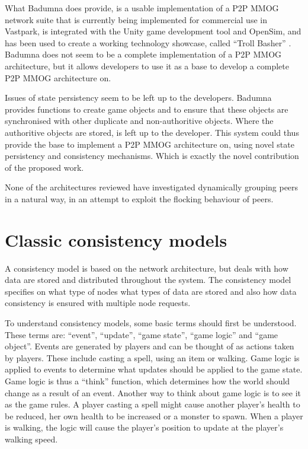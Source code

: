 \documentclass[journal,oneside,a4paper,onecolumn]{IEEEtran}
\begin{document}
What Badumna does provide, is a usable implementation of a P2P MMOG network suite that is currently being implemented for commercial use in Vastpark, is integrated with the Unity game development tool and OpenSim, and has been used to create a working technology showcase, called ``Troll Basher'' \cite{badumna_showcase}. Badumna does not seem to be a complete implementation of a P2P MMOG architecture, but it allows developers to use it as a base to develop a complete P2P MMOG architecture on.

Issues of state persistency seem to be left up to the developers. Badumna provides functions to create game objects and to ensure that these objects are synchronised with other duplicate and non-authoritive objects. Where the authoritive objects are stored, is left up to the developer. This system could thus provide the base to implement a P2P MMOG architecture on, using novel state persistency and consistency mechanisms. Which is exactly the novel contribution of the proposed work.

None of the architectures reviewed have investigated dynamically grouping peers in a natural way, in an attempt to exploit the flocking behaviour of peers.



\section{Classic consistency models}
\label{consistency_models}

A consistency model is based on the network architecture, but deals with how data are stored and distributed throughout the system. The consistency model specifies on what type of nodes what types of data are stored and also how data consistency is ensured with multiple node requests.

To understand consistency models, some basic terms should first be understood. These terms are: ``event'', ``update'', ``game state'', ``game logic'' and ``game object''. Events are generated by players and can be thought of as actions taken by players. These include casting a spell, using an item or walking. Game logic is applied to events to determine what updates should be applied to the game state. Game logic is thus a ``think'' function, which determines how the world should change as a result of an event. Another way to think about game logic is to see it as the game rules. A player casting a spell might cause another player's health to be reduced, her own health to be increased or a monster to spawn. When a player is walking, the logic will cause the player's position to update at the player's walking speed.
\end{document}
